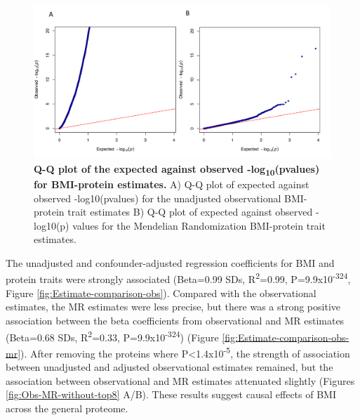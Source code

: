 \documentclass[11pt,twoside]{bristolthesis}
\begin{document}
\begin{figure}
\includegraphics[width=0.95\linewidth]{figure/BMI_protein_INTERVAL/QQ_obs_MR} \caption[Q-Q plot of the expected against observed -log\textsubscript{10}(pvalues) for BMI-protein estimates]{\textbf{Q-Q plot of the expected against observed -log\textsubscript{10}(pvalues) for BMI-protein estimates.} A) Q-Q plot of expected against observed -log10(pvalues) for the unadjusted observational BMI-protein trait estimates B) Q-Q plot of expected against observed -log10(p) values for the Mendelian Randomization BMI-protein trait estimates.}\label{fig:QQ-obs-MR}
\end{figure}
The unadjusted and confounder-adjusted regression coefficients for BMI and protein traits were strongly associated (Beta=0.99 SDs, R\textsuperscript{2}=0.99, P=9.9x10\textsuperscript{-324}, Figure \ref{fig:Estimate-comparison-obs}). Compared with the observational estimates, the MR estimates were less precise, but there was a strong positive association between the beta coefficients from observational and MR estimates (Beta=0.68 SDs, R\textsuperscript{2}=0.33, P=9.9x10\textsuperscript{-324}) (Figure \ref{fig:Estimate-comparison-obs-mr}). After removing the proteins where P\textless1.4x10\textsuperscript{-5}, the strength of association between unadjusted and adjusted observational estimates remained, but the association between observational and MR estimates attenuated slightly (Figures \ref{fig:Obs-MR-without-top8} A/B). These results suggest causal effects of BMI across the general proteome.
\end{document}
